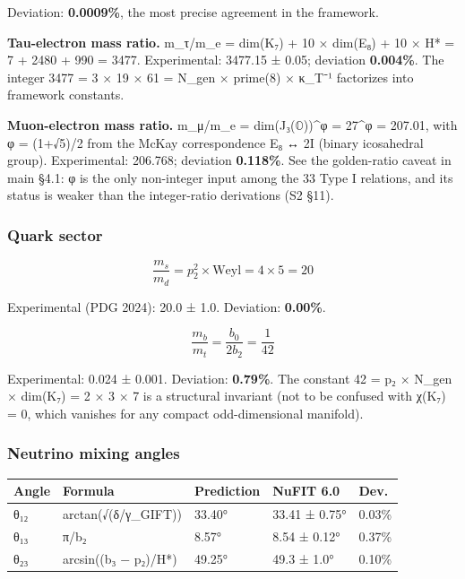 \documentclass[11pt,a4paper]{article}
\begin{document}
Deviation: \textbf{0.0009\%}, the most precise agreement in the framework.

\textbf{Tau-electron mass ratio.} m\_\allowbreak{}τ/m\_\allowbreak{}e = dim(K₇) + 10 × dim(E₈) + 10 × H* = 7 + 2480 + 990 = 3477. Experimental: 3477.15 ± 0.05; deviation \textbf{0.004\%}. The integer 3477 = 3 × 19 × 61 = N\_\allowbreak{}gen × prime(8) × κ\_\allowbreak{}T⁻¹ factorizes into framework constants.

\textbf{Muon-electron mass ratio.} m\_\allowbreak{}μ/m\_\allowbreak{}e = dim(J₃(\ensuremath{\mathbb{O}}))\^{}φ = 27\^{}φ = 207.01, with φ = (1+√5)/2 from the McKay correspondence E₈ ↔ 2I (binary icosahedral group). Experimental: 206.768; deviation \textbf{0.118\%}. See the golden-ratio caveat in main §4.1: φ is the only non-integer input among the 33 Type I relations, and its status is weaker than the integer-ratio derivations (S2 §11).

\subsubsection{Quark sector}\label{quark-sector}

\[\frac{m_s}{m_d} = p_2^2 \times \text{Weyl} = 4 \times 5 = 20\]

Experimental (PDG 2024): 20.0 ± 1.0. Deviation: \textbf{0.00\%}.

\[\frac{m_b}{m_t} = \frac{b_0}{2b_2} = \frac{1}{42}\]

Experimental: 0.024 ± 0.001. Deviation: \textbf{0.79\%}. The constant 42 = p₂ × N\_\allowbreak{}gen × dim(K₇) = 2 × 3 × 7 is a structural invariant (not to be confused with χ(K₇) = 0, which vanishes for any compact odd-dimensional manifold).

\subsubsection{Neutrino mixing angles}\label{neutrino-mixing-angles}

\begin{longtable}[]{@{}lllll@{}}
\toprule\noalign{}
Angle & Formula & Prediction & NuFIT 6.0 \cite{27} & Dev. \\
\midrule\noalign{}
\endhead
\bottomrule\noalign{}
\endlastfoot
θ₁₂ & arctan(√(δ/γ\_\allowbreak{}GIFT)) & 33.40° & 33.41 ± 0.75° & 0.03\% \\
θ₁₃ & π/b₂ & 8.57° & 8.54 ± 0.12° & 0.37\% \\
θ₂₃ & arcsin((b₃ − p₂)/H*) & 49.25° & 49.3 ± 1.0° & 0.10\% \\
\end{longtable}
\end{document}
